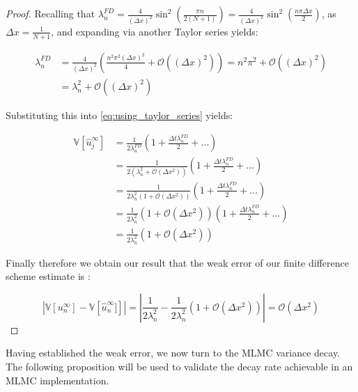 \begin{proof}
Recalling that $\lambda_n^{FD} = \frac{4}{(\Delta x)^2}
\sin^2\left(\frac{\pi n}{2(N+1)}\right) = \frac{4}{(\Delta x)^2}
\sin^2\left(\frac{n \pi \Delta x}{2}\right)$, as $\Delta x = \frac{1}
{N+1}$, and expanding via another Taylor series yields:

\begin{align*}
    \lambda_n^{FD} &= \frac{4}{(\Delta x)^2}\left(\frac{n^2 
    \pi^2 (\Delta x)^2}{4} + \mathcal{O}((\Delta x)^2)\right) = 
    n^2\pi^2 + \mathcal{O}((\Delta x)^2) \\
    &= \lambda_n^2 + \mathcal{O}((\Delta x)^2)
\end{align*}

Substituting this into \eqref{eq:using_taylor_series} yields:

\begin{align*}
    \mathbb{V}[\hat{u}_j^\infty] &= 
    \frac{1}{2\lambda_n^{FD}}\left(1 + 
    \frac{\Delta t \lambda_n^{FD}}{2} + \dots\right) \\
    &= \frac{1}{2\left(\lambda_n^2 + \mathcal{O}(\Delta x^2)\right)}\left(1 + \frac{\Delta t \lambda_n^{FD}}{2} + \dots\right) \\
    &= \frac{1}{2 \lambda_n^2 \left(1 + \mathcal{O}(\Delta x^2)\right)}\left(1 + \frac{\Delta t \lambda_n^{FD}}{2} + \dots\right) \\
    &= \frac{1}{2 \lambda_n^2}\left(1 + \mathcal{O}(\Delta x^2)\right)\left(1 + \frac{\Delta t \lambda_n^{FD}}{2} + \dots\right) \\
    &= \frac{1}{2 \lambda_n^2}\left(1 + \mathcal{O}(\Delta x^2)\right)
    \label{eq:final_result}
\end{align*}

Finally therefore we obtain our result that the weak error
of our finite difference scheme estimate is :

\begin{equation*}
    |\mathbb{V}\left[u_n^\infty\right] - \mathbb{V}\left[\hat{u}_n^\infty]\right]| = |\frac{1}{2\lambda_n^2} - \frac{1}{2 \lambda_n^2}\left(1 + \mathcal{O}(\Delta x^2)\right)|
    = \mathcal{O}(\Delta x^2)
\end{equation*}
\end{proof}


Having established the weak error, we now turn to the MLMC variance decay. 
The following proposition will be used to validate the decay 
rate achievable in an MLMC implementation.

